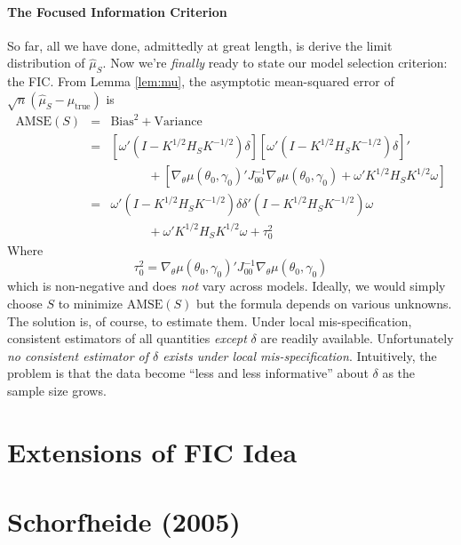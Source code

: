 \documentclass[12pt]{article}
\theoremstyle{definition}
\begin{document}
\paragraph{The Focused Information Criterion} So far, all we have done, admittedly at great length, is derive the limit distribution of $\widehat{\mu}_S$. Now we're \emph{finally} ready to state our model selection criterion: the FIC. From Lemma \ref{lem:mu}, the asymptotic mean-squared error of $\sqrt{n}\left(\widehat{\mu}_S - \mu_{\mbox{true}} \right)$ is
	\begin{eqnarray*}
		\mbox{AMSE}(S) &=& \mbox{Bias}^2 + \mbox{Variance}\\
		&=&\left[\omega'(I - K^{1/2}H_SK^{-1/2})\delta \right] \left[\omega'(I - K^{1/2}H_SK^{-1/2})\delta \right]'\\
			&& \quad \quad \quad + \left[\nabla_\theta \mu(\theta_0, \gamma_0)'J_{00}^{-1}\nabla_\theta \mu(\theta_0, \gamma_0) + \omega'K^{1/2}H_S K^{1/2}\omega \right]\\
		&=& \omega' (I - K^{1/2}H_SK^{-1/2})\delta \delta'(I - K^{1/2}H_SK^{-1/2})\omega \\
		&& \quad \quad \quad + \omega'K^{1/2}H_S K^{1/2}\omega  + \tau_0^2
	\end{eqnarray*}
Where 
	$$\tau_0^2 = \nabla_\theta \mu(\theta_0, \gamma_0)'J_{00}^{-1}\nabla_\theta \mu(\theta_0, \gamma_0)$$
which is non-negative and does \emph{not} vary across models. Ideally, we would simply choose $S$ to minimize $\mbox{AMSE}(S)$ but the formula depends on various unknowns. The solution is, of course, to estimate them. Under local mis-specification, consistent estimators of all quantities \emph{except} $\delta$ are readily available. Unfortunately \emph{no consistent estimator of $\delta$ exists under local mis-specification}. Intuitively, the problem is that the data become ``less and less informative'' about $\delta$ as the sample size grows.




\section{Extensions of FIC Idea}

\section{Schorfheide (2005)}
\end{document}
